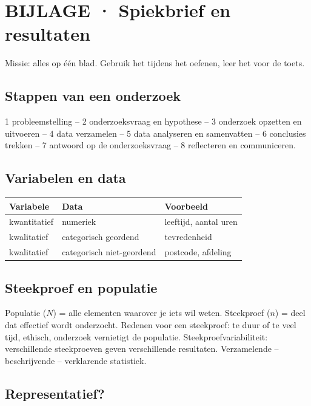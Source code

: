 \section{BIJLAGE · Spiekbrief en resultaten}

\begin{missie}
Missie: alles op één blad. Gebruik het tijdens het oefenen, leer het voor de toets.
\end{missie}

\subsection*{Stappen van een onderzoek}

1 probleemstelling – 2 onderzoeksvraag en hypothese – 3 onderzoek opzetten en uitvoeren – 4 data verzamelen – 5 data analyseren en samenvatten – 6 conclusies trekken – 7 antwoord op de onderzoeksvraag – 8 reflecteren en communiceren.

\subsection*{Variabelen en data}

\begin{tabular}{lll}
\hline
Variabele & Data & Voorbeeld \\
\hline
kwantitatief & numeriek & leeftijd, aantal uren \\
kwalitatief & categorisch geordend & tevredenheid \\
kwalitatief & categorisch niet-geordend & postcode, afdeling \\
\hline
\end{tabular}

\subsection*{Steekproef en populatie}

Populatie ($N$) = alle elementen waarover je iets wil weten. Steekproef ($n$) = deel dat effectief wordt onderzocht. Redenen voor een steekproef: te duur of te veel tijd, ethisch, onderzoek vernietigt de populatie. Steekproefvariabiliteit: verschillende steekproeven geven verschillende resultaten. Verzamelende – beschrijvende – verklarende statistiek.

\subsection*{Representatief?}

